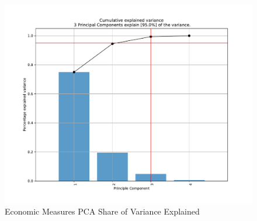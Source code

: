 \documentclass{report}
\begin{document}
	\begin{figure}[h!]
		\centering
		\caption{Economic Measures PCA Share of Variance Explained}
		\label{Econ_Share_Explained}	
		\includegraphics[width=\linewidth,keepaspectratio=true]{../Output/Figures/GDP_LE_Share_Explained.pdf}
	\end{figure}
\end{document}
